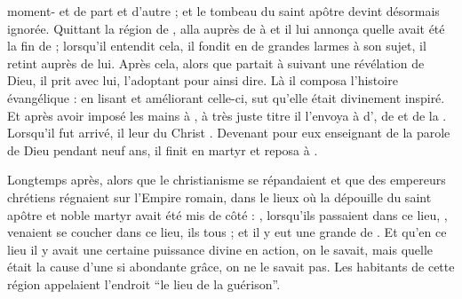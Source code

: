  moment-   et  de part et d'autre ; %
et le tombeau du saint apôtre  devint désormais ignorée.
Quittant la région de ,  alla auprès de  à 
et il lui annonça quelle avait été la fin de  ;
lorsqu'il entendit cela, il fondit en de grandes larmes à son sujet, il retint  auprès de lui.
Après cela, alors que  partait à  suivant une révélation de Dieu, il prit  avec lui, l'adoptant pour ainsi dire.
Là il composa l'histoire évangélique :
en lisant et améliorant celle-ci,  sut qu'elle était divinement inspiré. 
Et après avoir imposé les mains à , à très juste titre il l'envoya 
 à  d', de  et de la . %
Lorsqu'il fut arrivé, il leur  du Christ .
Devenant  pour eux enseignant de la parole de Dieu pendant neuf ans, il finit en martyr et reposa à .

\saut

Longtemps après, alors que le christianisme se répandaient et que des empereurs chrétiens régnaient sur l'Empire romain,  dans le lieux où la dépouille du saint apôtre et noble martyr  avait été mis de côté :
, lorsqu'ils passaient dans ce lieu, ,  venaient se coucher dans ce lieu, ils  tous ; et il y eut une grande  de .
Et qu'en ce lieu il y avait une certaine puissance divine en action, on le savait, 
mais quelle était la cause d'une si abondante grâce, on ne le savait pas.
Les habitants de cette région appelaient l'endroit \enquote{le lieu de la guérison}.

